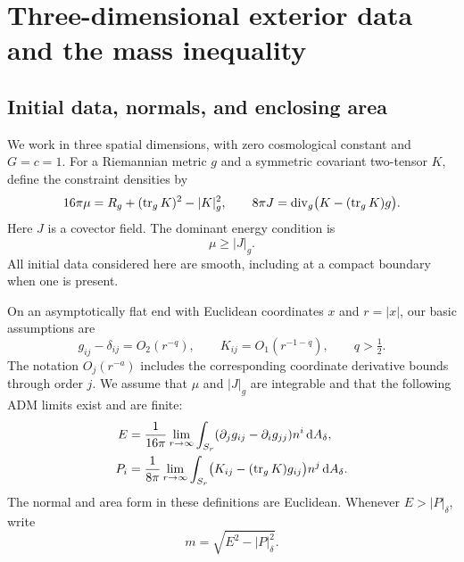 \section{Three-dimensional exterior data and the mass inequality}\label{n3:intro:section}

\subsection{Initial data, normals, and enclosing area}

We work in three spatial dimensions, with zero cosmological constant and
\(G=c=1\). For a Riemannian metric \(g\) and a symmetric covariant
two-tensor \(K\), define the constraint densities by
\begin{equation}\label{n3:intro:constraints}
 16\pi\mu=R_g+(\operatorname{tr}_gK)^2-|K|_g^2,\qquad
 8\pi J=\operatorname{div}_g\bigl(K-(\operatorname{tr}_gK)g\bigr).
\end{equation}
Here \(J\) is a covector field. The dominant energy condition is
\begin{equation}\label{n3:intro:dec}
                         \mu\ge |J|_g.
\end{equation}
All initial data considered here are smooth, including at a compact
boundary when one is present.

On an asymptotically flat end with Euclidean coordinates \(x\) and
\(r=|x|\), our basic assumptions are
\begin{equation}\label{n3:intro:decay}
 g_{ij}-\delta_{ij}=O_2(r^{-q}),\qquad
 K_{ij}=O_1(r^{-1-q}),\qquad q>\tfrac12.
\end{equation}
The notation \(O_j(r^{-a})\) includes the corresponding coordinate
derivative bounds through order \(j\). We assume that \(\mu\) and
\(|J|_g\) are integrable and that the following ADM limits exist and are
finite:
\begin{align}
 E&=\frac1{16\pi}\lim_{r\to\infty}
   \int_{S_r}(\partial_jg_{ij}-\partial_i g_{jj})n^i
                    \,\mathrm d A_\delta,\label{n3:intro:energy}\\
 P_i&=\frac1{8\pi}\lim_{r\to\infty}
   \int_{S_r}\bigl(K_{ij}-(\operatorname{tr}_gK)g_{ij}\bigr)n^j
                    \,\mathrm d A_\delta.\label{n3:intro:momentum}
\end{align}
The normal and area form in these definitions are Euclidean. Whenever
\(E>|P|_\delta\), write
\begin{equation}\label{n3:intro:rest-mass}
                         m=\sqrt{E^2-|P|_\delta^2}.
\end{equation}

